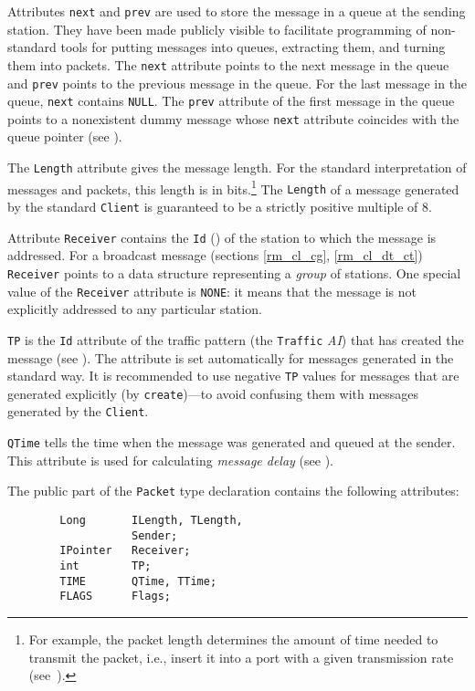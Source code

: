Attributes {\tt next} and {\tt prev} are used to store the message in a
queue at the sending station.
They have been made publicly visible to facilitate programming of non-standard
tools for putting messages into queues, extracting them, and turning them
into packets.
The {\tt next} attribute points to the next message in the queue and {\tt prev}
points to the previous message in the queue.
For the last message in the queue, {\tt next} contains {\tt NULL}.
The {\tt prev} attribute of the first message in the queue points to a
nonexistent
dummy message whose {\tt next} attribute coincides with the queue pointer
(see ).

The {\tt Length} attribute gives the message length.
For the standard interpretation of messages and packets, this length is in
bits.\footnote{For example, the packet length determines the amount of time
needed to transmit the packet, i.e., insert it into a port with a given
transmission rate (see~).}
The {\tt Length} of a message generated by the standard {\tt Client} is
guaranteed to be a strictly positive multiple of 8.

Attribute {\tt Receiver} contains the {\tt Id} ()
of the station to which the message is addressed.
For a broadcast message (sections \ref{rm_cl_cg}, \ref{rm_cl_dt_ct})
{\tt Receiver} points to a data
structure representing a {\em group\/} of stations.
One special value of the {\tt Receiver} attribute is {\tt NONE}: it means that
the message is not explicitly addressed to any particular station.

{\tt TP} is the {\tt Id} attribute of the traffic pattern (the {\tt Traffic}
{\em AI\/}) that has created the message (see ).
The attribute is set automatically for messages generated in the standard way.
It is recommended to use negative {\tt TP}
values for messages that are generated
explicitly (by {\tt create})---to avoid confusing them with messages
generated by the {\tt Client}.

{\tt QTime} tells the time when the message was generated and
queued at the sender.
This attribute is used for calculating {\em message delay\/}
(see ).

The public part of the {\tt Packet} type declaration contains the following
attributes:
\begin{verbatim}
        Long       ILength, TLength,
                   Sender;
        IPointer   Receiver;
        int        TP;
        TIME       QTime, TTime;
        FLAGS      Flags;
\end{verbatim}

